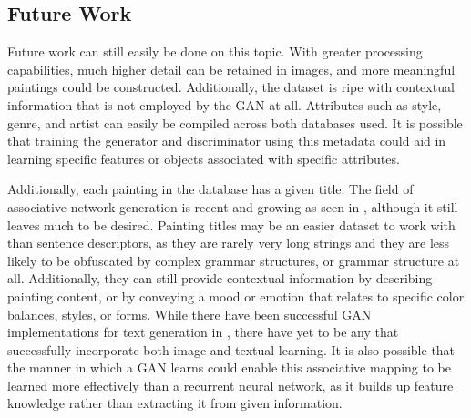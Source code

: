 \documentclass[10pt,twocolumn,letterpaper]{article}
\begin{document}
\subsection{Future Work}
Future work can still easily be done on this topic. With greater processing capabilities, much higher detail can be retained in images, and more meaningful paintings could be constructed. Additionally, the dataset is ripe with contextual information that is not employed by the GAN at all. Attributes such as style, genre, and artist can easily be compiled across both databases used. It is possible that training the generator and discriminator using this metadata could aid in learning specific features or objects associated with specific attributes.

Additionally, each painting in the database has a given title. The field of associative network generation is recent and growing as seen in \cite{ishibashi2018associative}, although it still leaves much to be desired. Painting titles may be an easier dataset to work with than sentence descriptors, as they are rarely very long strings and they are less likely to be obfuscated by complex grammar structures, or grammar structure at all. Additionally, they can still provide contextual information by describing painting content, or by conveying a mood or emotion that relates to specific color balances, styles, or forms. While there have been successful GAN implementations for text generation in \cite{zhang2017adversarial}, there have yet to be any that successfully incorporate both image and textual learning. It is also possible that the manner in which a GAN learns could enable this associative mapping to be learned more effectively than a recurrent neural network, as it builds up feature knowledge rather than extracting it from given information.

{\small


}
\end{document}
